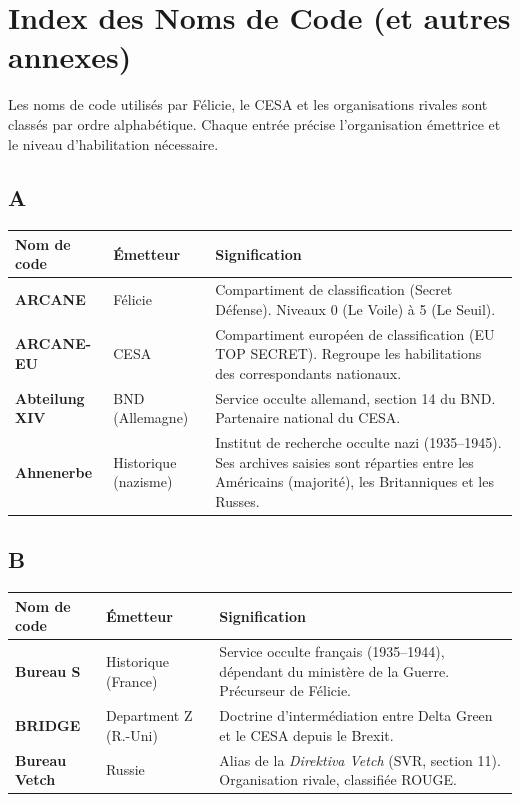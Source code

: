 \documentclass[10pt,a5paper,twoside]{book}
\begin{document}
\clearpage


\chapter{Index des Noms de Code (et autres annexes)}

Les noms de code utilisés par Félicie, le CESA et les organisations rivales sont classés par ordre alphabétique. Chaque entrée précise l'organisation émettrice et le niveau d'habilitation nécessaire.

\section*{A}

\begin{tabular}{|P{2.5cm}|P{2.5cm}|P{6.0cm}|}
\hline
\textbf{Nom de code} & \textbf{Émetteur} & \textbf{Signification} \\
\hline
\textbf{ARCANE} & Félicie & Compartiment de classification (Secret Défense). Niveaux 0 (Le Voile) à 5 (Le Seuil). \\
\hline
\textbf{ARCANE-EU} & CESA & Compartiment européen de classification (EU TOP SECRET). Regroupe les habilitations des correspondants nationaux. \\
\hline
\textbf{Abteilung XIV} & BND (Allemagne) & Service occulte allemand, section 14 du BND. Partenaire national du CESA. \\
\hline
\textbf{Ahnenerbe} & Historique (nazisme) & Institut de recherche occulte nazi (1935--1945). Ses archives saisies sont réparties entre les Américains (majorité), les Britanniques et les Russes. \\
\hline
\end{tabular}

\section*{B}

\begin{tabular}{|P{2.5cm}|P{2.5cm}|P{6.0cm}|}
\hline
\textbf{Nom de code} & \textbf{Émetteur} & \textbf{Signification} \\
\hline
\textbf{Bureau S} & Historique (France) & Service occulte français (1935--1944), dépendant du ministère de la Guerre. Précurseur de Félicie. \\
\hline
\textbf{BRIDGE} & Department Z (R.-Uni) & Doctrine d'intermédiation entre Delta Green et le CESA depuis le Brexit. \\
\hline
\textbf{Bureau Vetch} & Russie & Alias de la \textit{Direktiva Vetch} (SVR, section 11). Organisation rivale, classifiée ROUGE. \\
\hline
\end{tabular}
\end{document}

